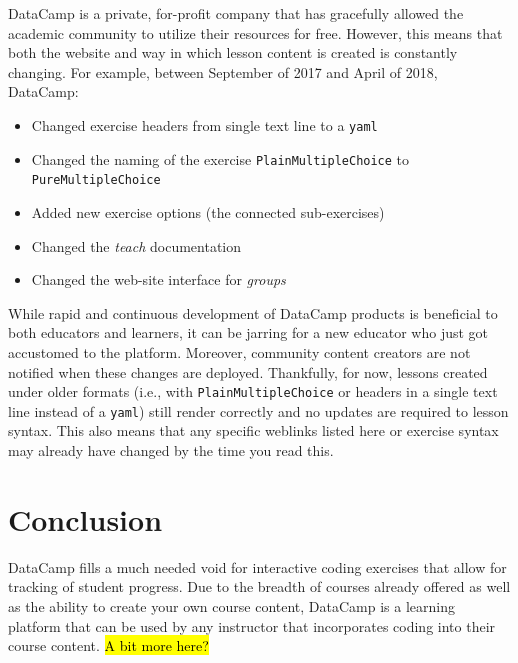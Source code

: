 \documentclass{tise_style_doi}
\begin{document}
DataCamp is a private, for-profit company that has gracefully allowed
the academic community to utilize their resources for free.  However,
this means that both the website and way in which lesson content
is created is constantly changing.  For example, between September of
2017 and April of 2018, DataCamp:
\begin{itemize}
\item Changed exercise headers from single text line to a \texttt{yaml}
\item Changed the naming of the exercise \texttt{PlainMultipleChoice}
to \texttt{PureMultipleChoice}
\item Added new exercise options (the connected sub-exercises)
\item Changed the \emph{teach} documentation
\item Changed the web-site interface for \emph{groups}
\end{itemize}
While rapid and continuous development of DataCamp products is beneficial
to both educators and learners, it can be jarring for a new educator
who just got accustomed to the platform.  Moreover, community
content creators are not notified when these changes are deployed.
Thankfully, for now, lessons created under older formats (i.e.,
with \texttt{PlainMultipleChoice} or headers in a single text
line instead of a \texttt{yaml}) still render correctly and no updates are required to
lesson syntax. This also means that any specific weblinks listed
here or exercise syntax may already have changed by the time you read this.

\section{Conclusion}

DataCamp fills a much needed void for interactive coding exercises that allow
for tracking of student progress.  Due to the breadth of courses already offered as
well as the ability to create your own course content, DataCamp is a learning
platform that can be used by any instructor that incorporates coding into their
course content.  \hl{A bit more here?}


\end{document}
